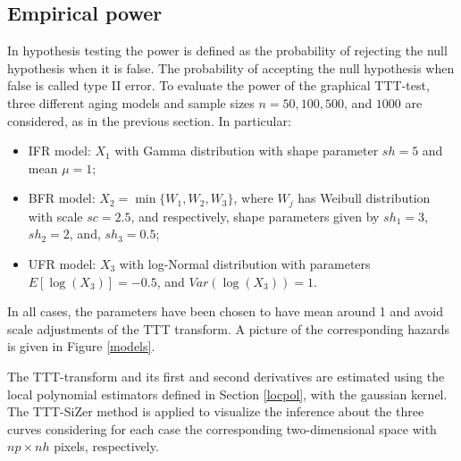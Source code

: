 \documentclass[preprint,12pt]{elsarticle}
\begin{document}
\subsection{Empirical power}

In hypothesis testing the power is defined as the probability of rejecting the null hypothesis when it is false. The probability of accepting the null hypothesis when false is called type II error. To evaluate the power of the graphical TTT-test, three  different aging models and sample sizes $n = 50, 100, 500$, and $1000$ are considered, as in the previous section.  In particular:
\begin{itemize}
\item IFR model: $X_1$ with Gamma distribution with shape parameter $sh=5$ and mean $\mu=1$;
\item BFR model: $X_2= \min\{W_1, W_2, W_3\}$, where $W_j$ has Weibull distribution with scale $sc=2.5$, and respectively, shape parameters given by $sh_1=3$, $sh_2=2$, and, $sh_3=0.5$;
\item UFR model: $X_3$ with log-Normal distribution with parameters $E[ \log (X_3)]=-0.5$, and $Var(\log(X_3))=1$.
\end{itemize}
In all cases, the parameters have been chosen to have mean around 1 and avoid scale adjustments of the TTT transform. A picture of the corresponding hazards is given in Figure \ref{models}.

The TTT-transform and its first and second derivatives are estimated using the local polynomial estimators defined in Section \ref{locpol}, with the gaussian kernel. The TTT-SiZer method is applied to visualize the inference about the three curves considering for each case the corresponding two-dimensional space with $np \times nh$ pixels, respectively.  
\end{document}
